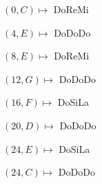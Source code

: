 \documentclass[preview]{standalone}
\begin{document}
\begin{center}
$(0,C) \mapsto$ DoReMi

$(4,E) \mapsto$ DoDoDo

$(8,E) \mapsto$ DoReMi

$(12,G) \mapsto$ DoDoDo

$(16,F) \mapsto$ DoSiLa

$(20,D) \mapsto$ DoDoDo

$(24,E) \mapsto$ DoSiLa

$(24,C) \mapsto$ DoDoDo
\end{center}
\end{document}
